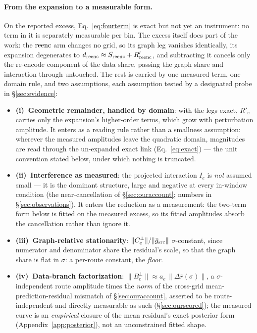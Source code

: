 \paragraph{From the expansion to a measurable form.}
On the reported excess, Eq.~\ref{eq:fourterm} is exact but not yet an
instrument: no term in it is separately measurable per bin. The
excess itself does part of the work: the $\mathrm{reenc}$ arm changes no
grid, so its graph leg vanishes identically, its expansion degenerates
to $d_{\mathrm{reenc}} \approx S_{\mathrm{reenc}} + R'_{\mathrm{reenc}}$, and subtracting it
cancels only the re-encode component of the data share, passing the
graph share and interaction through untouched. The rest is carried by
one measured term, one domain rule, and two assumptions, each
assumption tested by a designated probe in \S\ref{sec:evidence}:
\begin{itemize}
\item \textbf{(i)~Geometric remainder, handled by domain}: with the
legs exact, $R'_e$ carries only the expansion's higher-order terms,
which grow with perturbation amplitude. It enters as a reading rule
rather than a smallness assumption: wherever the measured amplitudes
leave the quadratic domain, magnitudes are read through the
un-expanded exact link (Eq.~\ref{eq:exact}) --- the unit convention
stated below, under which nothing is truncated.
\item \textbf{(ii)~Interference as measured}: the projected
interaction $I_e$ is \emph{not} assumed small --- it is the dominant
structure, large and negative at every in-window condition (the
near-cancellation of \S\ref{sec:ouraccount}; numbers in
\S\ref{sec:observations}). It enters the reduction as a measurement:
the two-term form below is fitted on the measured excess, so its
fitted amplitudes absorb the cancellation rather than ignore it.
\item \textbf{(iii)~Graph-relative stationarity}:
$\|C_e^{\perp}\| / \|\bar g_{\mathrm{src}}\|$ $\sigma$-constant, since
numerator and denominator share the residual's scale, so that the
graph share is flat in $\sigma$: a per-route constant, the
\emph{floor}.
\item \textbf{(iv)~Data-branch factorization}:
$\|B_e^{\perp}\| \approx a_e\,\|\Delta \bar r(\sigma)\|$, a
$\sigma$-independent route amplitude times the \emph{norm} of the
cross-grid mean-prediction-residual mismatch of \S\ref{sec:ouraccount},
asserted to be route-independent and directly measurable as such
(\S\ref{sec:ourscored}); the measured curve is an \emph{empirical}
closure of the mean residual's exact posterior form
(Appendix~\ref{app:posterior}), not an unconstrained fitted shape.
\end{itemize}
